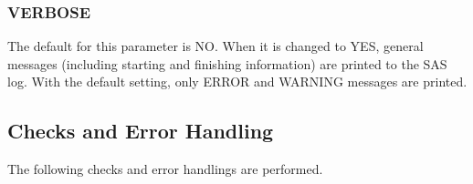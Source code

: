 \documentclass[
  letterpaper,
  DIV=11,
  numbers=noendperiod]{scrartcl}
\begin{document}
\hypertarget{verbose}{%
\subsubsection{VERBOSE}\label{verbose}}

The default for this parameter is NO. When it is changed to YES, general
messages (including starting and finishing information) are printed to
the SAS log. With the default setting, only ERROR and WARNING messages
are printed.

\hypertarget{checks-and-error-handling}{%
\subsection{Checks and Error Handling}\label{checks-and-error-handling}}

The following checks and error handlings are performed.
\end{document}
